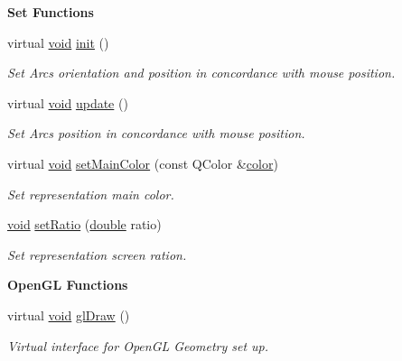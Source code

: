 \begin{Indent}{\bf Set Functions}\par
\begin{DoxyCompactItemize}
\item 
virtual \hyperlink{group___u_a_v_objects_plugin_ga444cf2ff3f0ecbe028adce838d373f5c}{void} \hyperlink{class_g_l_c___rep_track_ball_mover_a886fa8f1a2b3c88f326a92d47eff57fb}{init} ()
\begin{DoxyCompactList}\small\item\em Set Arcs orientation and position in concordance with mouse position. \end{DoxyCompactList}\item 
virtual \hyperlink{group___u_a_v_objects_plugin_ga444cf2ff3f0ecbe028adce838d373f5c}{void} \hyperlink{class_g_l_c___rep_track_ball_mover_ad974cac18d0b62d850d445686ab05d3c}{update} ()
\begin{DoxyCompactList}\small\item\em Set Arcs position in concordance with mouse position. \end{DoxyCompactList}\item 
virtual \hyperlink{group___u_a_v_objects_plugin_ga444cf2ff3f0ecbe028adce838d373f5c}{void} \hyperlink{class_g_l_c___rep_track_ball_mover_a0c1ea7edda127814a09dd04fb46f3bd1}{set\-Main\-Color} (const Q\-Color \&\hyperlink{glext_8h_a3ea846f998d64f079b86052b6c4193a8}{color})
\begin{DoxyCompactList}\small\item\em Set representation main color. \end{DoxyCompactList}\item 
\hyperlink{group___u_a_v_objects_plugin_ga444cf2ff3f0ecbe028adce838d373f5c}{void} \hyperlink{class_g_l_c___rep_track_ball_mover_a94390de897048ec7c49b4dad5df0a706}{set\-Ratio} (\hyperlink{_super_l_u_support_8h_a8956b2b9f49bf918deed98379d159ca7}{double} ratio)
\begin{DoxyCompactList}\small\item\em Set representation screen ration. \end{DoxyCompactList}\end{DoxyCompactItemize}
\end{Indent}
\begin{Indent}{\bf Open\-G\-L Functions}\par
\begin{DoxyCompactItemize}
\item 
virtual \hyperlink{group___u_a_v_objects_plugin_ga444cf2ff3f0ecbe028adce838d373f5c}{void} \hyperlink{class_g_l_c___rep_track_ball_mover_adfb05178675fe8243c141197bfcd4473}{gl\-Draw} ()
\begin{DoxyCompactList}\small\item\em Virtual interface for Open\-G\-L Geometry set up. \end{DoxyCompactList}\end{DoxyCompactItemize}
\end{Indent}
